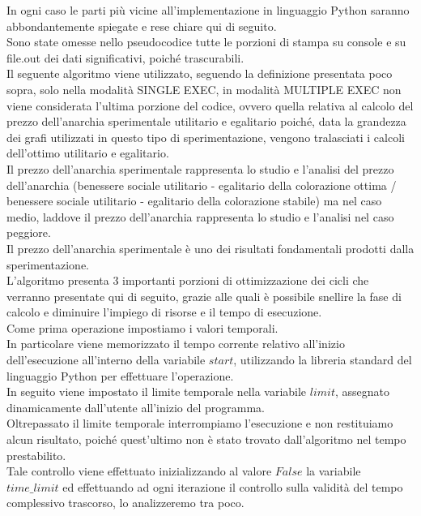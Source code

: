 In ogni caso le parti più vicine all'implementazione in linguaggio Python saranno abbondantemente spiegate e rese chiare qui di seguito.\\

Sono state omesse nello pseudocodice tutte le porzioni di stampa su console e su file.out dei dati significativi, poiché trascurabili.\\

Il seguente algoritmo viene utilizzato, seguendo la definizione presentata poco sopra, solo nella modalità SINGLE EXEC, in modalità MULTIPLE EXEC non viene considerata l'ultima porzione del codice, ovvero quella relativa al calcolo del prezzo dell'anarchia sperimentale utilitario e egalitario poiché, data la grandezza dei grafi utilizzati in questo tipo di sperimentazione, vengono tralasciati i calcoli dell'ottimo utilitario e egalitario.\\

Il prezzo dell'anarchia sperimentale rappresenta lo studio e l'analisi del prezzo dell'anarchia (benessere sociale utilitario - egalitario della colorazione ottima / benessere sociale utilitario - egalitario della colorazione stabile) ma nel caso medio, laddove il prezzo dell'anarchia rappresenta lo studio e l'analisi nel caso peggiore.\\
Il prezzo dell'anarchia sperimentale è uno dei risultati fondamentali prodotti dalla sperimentazione.\\

L'algoritmo presenta 3 importanti porzioni di ottimizzazione dei cicli che verranno presentate qui di seguito, grazie alle quali è possibile snellire la fase di calcolo e diminuire l'impiego di risorse e il tempo di esecuzione.\\

Come prima operazione impostiamo i valori temporali.\\
In particolare viene memorizzato il tempo corrente relativo all'inizio dell'esecuzione all'interno della variabile $start$, utilizzando la libreria standard del linguaggio Python per effettuare l'operazione.\\
In seguito viene impostato il limite temporale nella variabile $limit$, assegnato dinamicamente dall'utente all'inizio del programma.\\
Oltrepassato il limite temporale interrompiamo l'esecuzione e non restituiamo alcun risultato, poiché quest'ultimo non è stato trovato dall'algoritmo nel tempo prestabilito.\\
Tale controllo viene effettuato inizializzando al valore $False$ la variabile $time\_limit$ ed effettuando ad ogni iterazione il controllo sulla validità del tempo complessivo trascorso, lo analizzeremo tra poco.\\

